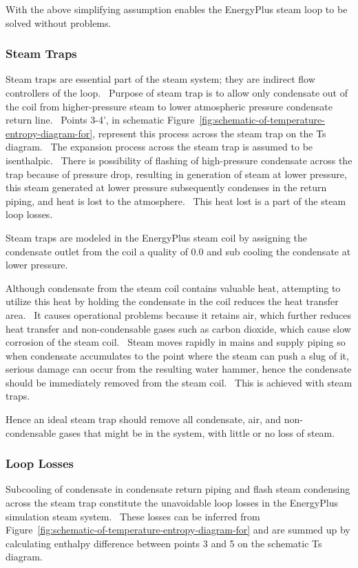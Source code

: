 With the above simplifying assumption enables the EnergyPlus steam loop to be solved without problems.

\subsubsection{Steam Traps}\label{steam-traps}

Steam traps are essential part of the steam system; they are indirect flow controllers of the loop.~ Purpose of steam trap is to allow only condensate out of the coil from higher-pressure steam to lower atmospheric pressure condensate return line.~ Points 3-4', in schematic Figure~\ref{fig:schematic-of-temperature-entropy-diagram-for}, represent this process across the steam trap on the Ts diagram.~ The expansion process across the steam trap is assumed to be isenthalpic.~ There is possibility of flashing of high-pressure condensate across the trap because of pressure drop, resulting in generation of steam at lower pressure, this steam generated at lower pressure subsequently condenses in the return piping, and heat is lost to the atmosphere.~ This heat lost is a part of the steam loop losses.

Steam traps are modeled in the EnergyPlus steam coil by assigning the condensate outlet from the coil a quality of 0.0 and sub cooling the condensate at lower pressure.

Although condensate from the steam coil contains valuable heat, attempting to utilize this heat by holding the condensate in the coil reduces the heat transfer area.~ It causes operational problems because it retains air, which further reduces heat transfer and non-condensable gases such as carbon dioxide, which cause slow corrosion of the steam coil.~ Steam moves rapidly in mains and supply piping so when condensate accumulates to the point where the steam can push a slug of it, serious damage can occur from the resulting water hammer, hence the condensate should be immediately removed from the steam coil.~ This is achieved with steam traps.

Hence an ideal steam trap should remove all condensate, air, and non-condensable gases that might be in the system, with little or no loss of steam.

\subsubsection{Loop Losses}\label{loop-losses}

Subcooling of condensate in condensate return piping and flash steam condensing across the steam trap constitute the unavoidable loop losses in the EnergyPlus simulation steam system.~ These losses can be inferred from Figure~\ref{fig:schematic-of-temperature-entropy-diagram-for} and are summed up by calculating enthalpy difference between points 3 and 5 on the schematic Ts diagram.

